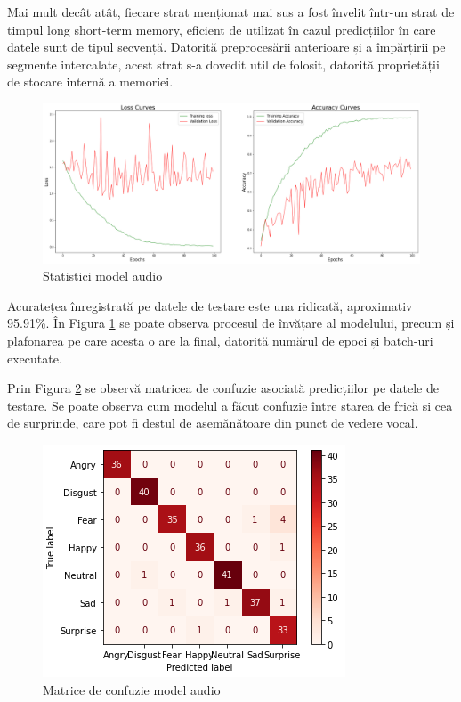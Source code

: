 \documentclass[a4paper, 12pt]{report}
\begin{document}
 	Mai mult decât atât, fiecare strat menționat mai sus a fost învelit într-un strat de timpul long short-term memory, eficient de utilizat în cazul predicțiilor în care datele sunt de tipul secvență. Datorită preprocesării anterioare și a împărțirii pe segmente intercalate, acest strat s-a dovedit util de folosit, datorită proprietății de stocare internă a memoriei.
	
	\begin{figure}[H]
		\begin{center}
			\includegraphics[scale=0.2]{images/accuracy_audio_model.png}
		\end{center}
		\caption{Statistici model audio}
		\label{fig:audio_model_accuracy}
	\end{figure}
	
	Acuratețea înregistrată pe datele de testare este una ridicată, aproximativ 95.91\%. În Figura \ref{fig:audio_model_accuracy} se poate observa procesul de învățare al modelului, precum și plafonarea pe care acesta o are la final, datorită numărul de epoci și batch-uri executate.
	
	Prin Figura \ref{fig:audio_confusion_matrix} se observă matricea de confuzie asociată predicțiilor pe datele de testare. Se poate observa cum modelul a făcut confuzie între starea de frică și cea de surprinde, care pot fi destul de asemănătoare din punct de vedere vocal.
	
	\begin{figure}[H]
		\begin{center}
			\includegraphics[scale=0.4]{images/audio_confusion_matrix.png}
		\end{center}
		\caption{Matrice de confuzie model audio}
		\label{fig:audio_confusion_matrix}
	\end{figure}
	
\end{document}

